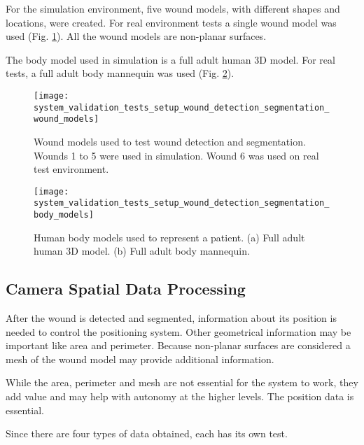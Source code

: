 For the simulation environment, five wound models, with different shapes and locations, were created. For real environment tests a single wound model was used (Fig. \ref{fig:system_validation_tests_setup_wound_detection_segmentation_wound_models}). All the wound models are non-planar surfaces. 

The body model used in simulation is a full adult human 3D model. For real tests, a full adult body  mannequin was used (Fig. \ref{fig:system_validation_tests_setup_wound_detection_segmentation_body_models}).

\begin{figure}[htbp]
	\centering
	\texttt{[image: system\_validation\_tests\_setup\_wound\_detection\_segmentation\_wound\_models]}
	\caption{Wound models used to test wound detection and segmentation. Wounds 1 to 5 were used in simulation. Wound 6 was used on real test environment.}
	\label{fig:system_validation_tests_setup_wound_detection_segmentation_wound_models}
\end{figure}

\begin{figure}[htbp]
	\centering
	\texttt{[image: system\_validation\_tests\_setup\_wound\_detection\_segmentation\_body\_models]}
	\caption{Human body models used to represent a patient. (a) Full adult human 3D model. (b) Full adult body mannequin.}
	\label{fig:system_validation_tests_setup_wound_detection_segmentation_body_models}
\end{figure}


\subsection{Camera Spatial Data Processing}
\label{subsec:system_validation_tests_setup_camera_spatial_data_processing}

After the wound is detected and segmented, information about its position is needed to control the positioning system. Other geometrical information may be important like area and perimeter. Because non-planar surfaces are considered a mesh of the wound model may provide additional information.

While the area, perimeter and mesh are not essential for the system to work, they add value and may help with autonomy at the higher levels. The position data is essential.

Since there are four types of data obtained, each has its own test.

